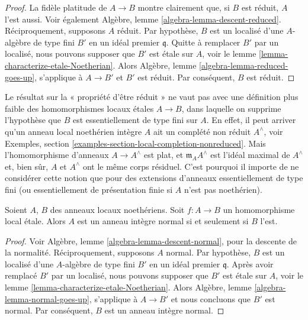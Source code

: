 \begin{proof}
La fidèle platitude de $A \to B$ montre clairement que, si $B$ est réduit,
$A$ l'est aussi. Voir également Algèbre, lemme \ref{algebra-lemma-descent-reduced}.
Réciproquement, supposons $A$ réduit. Par hypothèse, $B$ est un localisé
d'une $A$-algèbre de type fini $B'$ en un idéal premier $\mathfrak q$.
Quitte à remplacer $B'$ par un localisé, nous pouvons supposer que $B'$
est \'etale sur $A$, voir le lemme \ref{lemma-characterize-etale-Noetherian}.
Alors Algèbre, lemme \ref{algebra-lemma-reduced-goes-up}, s'applique à
$A \to B'$ et $B'$ est réduit. Par conséquent, $B$ est réduit.
\end{proof}

\begin{remark}
\label{remark-technicality-needed}
Le résultat sur la « propriété d'être réduit » ne vaut pas avec une définition plus
faible des homomorphismes locaux \'etales $A \to B$, dans laquelle on
supprime l'hypothèse que $B$ est essentiellement de type fini sur $A$.
En effet, il peut arriver qu'un anneau local noethérien intègre $A$ ait un
complété non réduit $A^\wedge$, voir
Exemples, section \ref{examples-section-local-completion-nonreduced}.
Mais l'homomorphisme d'anneaux $A \to A^\wedge$ est plat, et $\mathfrak m_AA^\wedge$
est l'idéal maximal de $A^\wedge$ et, bien sûr, $A$ et $A^\wedge$ ont
le même corps résiduel. C'est pourquoi il importe de ne considérer
cette notion que pour des extensions d'anneaux essentiellement de type fini
(ou essentiellement de présentation finie si $A$ n'est pas noethérien).
\end{remark}

\begin{proposition}
\label{proposition-etale-normal}
\begin{reference}
\cite[Expose I, Theorem 9.5 part (i)]{SGA1}
\end{reference}
Soient $A$, $B$ des anneaux locaux noethériens.
Soit $f : A \to B$ un homomorphisme local \'etale.
Alors $A$ est un anneau intègre normal si et seulement si $B$ l'est.
\end{proposition}

\begin{proof}
Voir
Algèbre, lemme \ref{algebra-lemma-descent-normal},
pour la descente de la normalité. Réciproquement, supposons $A$ normal.
Par hypothèse, $B$ est un localisé d'une $A$-algèbre de type fini
$B'$ en un idéal premier $\mathfrak q$. Après avoir remplacé $B'$ par un localisé,
nous pouvons supposer que $B'$ est \'etale sur $A$, voir
le lemme \ref{lemma-characterize-etale-Noetherian}.
Alors
Algèbre, lemme \ref{algebra-lemma-normal-goes-up},
s'applique à $A \to B'$ et nous concluons que $B'$ est normal.
Par conséquent, $B$ est un anneau intègre normal.
\end{proof}

